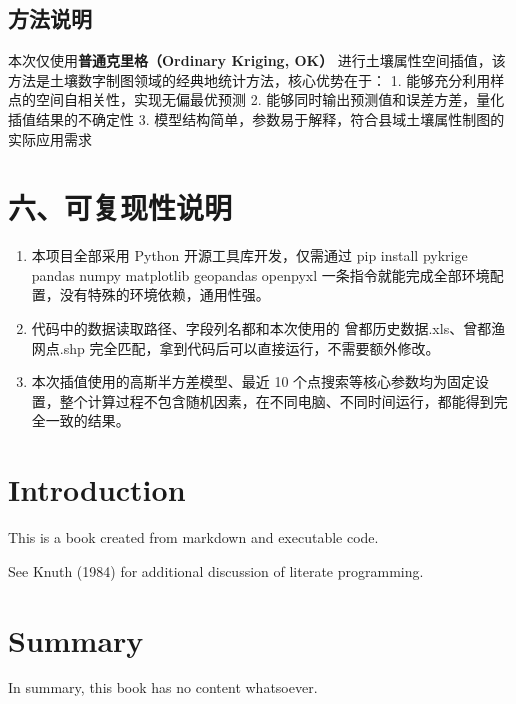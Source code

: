 \documentclass[
  letterpaper,
  DIV=11,
  numbers=noendperiod]{scrreprt}
\providecommand{\tightlist}{%
  \setlength{\itemsep}{0pt}\setlength{\parskip}{0pt}}
\begin{document}
\section{方法说明}\label{ux65b9ux6cd5ux8bf4ux660e}

本次仅使用\textbf{普通克里格（Ordinary Kriging, OK）}
进行土壤属性空间插值，该方法是土壤数字制图领域的经典地统计方法，核心优势在于：
1. 能够充分利用样点的空间自相关性，实现无偏最优预测 2.
能够同时输出预测值和误差方差，量化插值结果的不确定性 3.
模型结构简单，参数易于解释，符合县域土壤属性制图的实际应用需求


\chapter{六、可复现性说明}\label{ux516dux53efux590dux73b0ux6027ux8bf4ux660e}

\begin{enumerate}
\def\labelenumi{\arabic{enumi}.}
\tightlist
\item
  本项目全部采用 Python 开源工具库开发，仅需通过 pip install pykrige
  pandas numpy matplotlib geopandas openpyxl
  一条指令就能完成全部环境配置，没有特殊的环境依赖，通用性强。
\item
  代码中的数据读取路径、字段列名都和本次使用的
  曾都历史数据.xls、曾都渔网点.shp
  完全匹配，拿到代码后可以直接运行，不需要额外修改。
\item
  本次插值使用的高斯半方差模型、最近 10
  个点搜索等核心参数均为固定设置，整个计算过程不包含随机因素，在不同电脑、不同时间运行，都能得到完全一致的结果。
\end{enumerate}


\chapter{Introduction}\label{introduction}

This is a book created from markdown and executable code.

See Knuth (1984) for additional discussion of literate programming.


\chapter{Summary}\label{summary}

In summary, this book has no content whatsoever.
\end{document}
